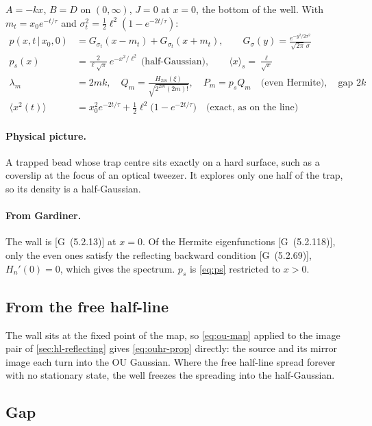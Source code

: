 \documentclass[11pt]{article}
\numberwithin{equation}{section}
\newcommand{\avg}[1]{\langle #1\rangle}
\newcommand{\given}{\,|\,}
\newcommand{\G}[1]{[G~(#1)]}
\begin{document}
\begin{keyresults}
$A=-kx$, $B=D$ on $(0,\infty)$, $J=0$ at $x=0$, the bottom of the well. With $m_t=x_0e^{-t/\tau}$ and
$\sigma_t^2=\tfrac12\ell^2(1-e^{-2t/\tau})$:
\begin{align}
  p(x,t\given x_0,0) &= G_{\sigma_t}(x-m_t)+G_{\sigma_t}(x+m_t),\qquad
  G_\sigma(y)=\frac{e^{-y^2/2\sigma^2}}{\sqrt{2\pi}\,\sigma} \label{eq:ouhr-prop}\\
  p_s(x) &= \frac{2}{\ell\sqrt\pi}\,e^{-x^2/\ell^2}\ \text{(half-Gaussian)},\qquad \avg x_s=\frac{\ell}{\sqrt\pi} \\
  \lambda_m &= 2mk,\quad Q_m=\frac{H_{2m}(\xi)}{\sqrt{2^{2m}(2m)!}},\quad P_m=p_sQ_m\quad\text{(even Hermite)},
  \quad\text{gap }2k \\
  \avg{x^2(t)} &= x_0^2e^{-2t/\tau}+\tfrac12\ell^2\bigl(1-e^{-2t/\tau}\bigr)\quad\text{(exact, as on the line)}
\end{align}
\end{keyresults}

\paragraph{Physical picture.} A trapped bead whose trap centre sits exactly on a hard surface, such as a
coverslip at the focus of an optical tweezer. It explores only one half of the trap, so its density is a
half-Gaussian.

\paragraph{From Gardiner.} The wall is \G{5.2.13} at $x=0$. Of the Hermite eigenfunctions \G{5.2.118}, only
the even ones satisfy the reflecting backward condition \G{5.2.69}, $H_n'(0)=0$, which gives the spectrum.
$p_s$ is \cref{eq:ps} restricted to $x>0$.

\subsection{From the free half-line}

The wall sits at the fixed point of the map, so \cref{eq:ou-map} applied to the image pair of
\cref{sec:hl-reflecting} gives \cref{eq:ouhr-prop} directly: the source and its mirror image each turn into
the OU Gaussian. Where the free half-line spread forever with no stationary state, the well freezes the
spreading into the half-Gaussian.

\subsection{Gap}
\end{document}
